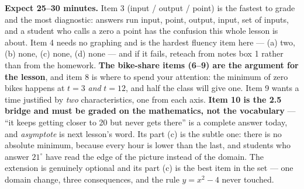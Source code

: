 \documentclass[10pt]{article}
\begin{document}
\boxguard[18]
\begin{teachernote}[Homework]
    \textbf{Expect 25--30 minutes.} Item 3 (input / output / point) is the fastest to grade and the
    most diagnostic: answers run input, point, output, input, set of inputs, and a student who calls a
    zero a point has the confusion this whole lesson is about. Item 4 needs no graphing and is the
    hardest fluency item here --- (a) two, (b) none, (c) none, (d) none --- and if it fails, reteach
    from notes box 1 rather than from the homework. \textbf{The bike-share items (6--9) are the
    argument for the lesson}, and item 8 is where to spend your attention: the minimum of zero bikes
    happens at $t=3$ \emph{and} $t=12$, and half the class will give one. Item 9 wants a time
    justified by \emph{two} characteristics, one from each axis. \textbf{Item 10 is the 2.5 bridge and
    must be graded on the mathematics, not the vocabulary} --- ``it keeps getting closer to 20 but
    never gets there'' is a complete answer today, and \emph{asymptote} is next lesson's word. Its
    part (c) is the subtle one: there is no absolute minimum, because every hour is lower than the
    last, and students who answer $21^\circ$ have read the edge of the picture instead of the domain.
    The extension is genuinely optional and its part (c) is the best item in the set --- one domain
    change, three consequences, and the rule $y=x^2-4$ never touched.
\end{teachernote}
\end{document}
